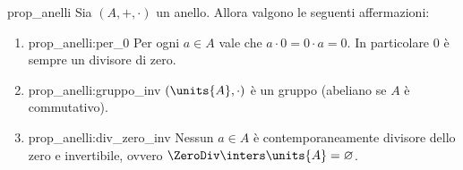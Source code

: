 \begin{proposition} 
    {prop_anelli}
    Sia $(A, +, \cdot)$ un anello. Allora valgono le seguenti affermazioni:
    \begin{enumerate}[label={(\roman*)}, ref={\theproposition: (\roman*)}]
        \item {prop_anelli:per_0} Per ogni $a \in A$ vale che $a \cdot 0 = 0 \cdot a = 0$. In particolare $0$ è sempre un divisore di zero.
        \item {prop_anelli:gruppo_inv} $(\units{A}, \cdot)$ è un gruppo (abeliano se $A$ è commutativo).
        \item {prop_anelli:div_zero_inv} Nessun $a \in A$ è contemporaneamente divisore dello zero e invertibile, ovvero $\ZeroDiv \inters \units{A} = \varnothing$.
    \end{enumerate}
\end{proposition}

